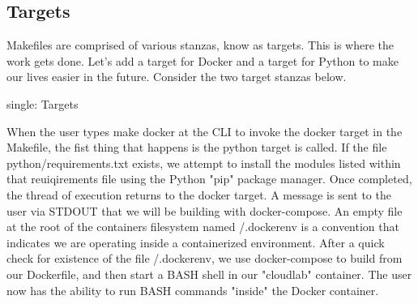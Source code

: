 \hypertarget{targets}{%
\subsection{Targets}\label{targets}}

Makefiles are comprised of various stanzas, know as targets. This is
where the work gets done. Let's add a target for Docker and a target for
Python to make our lives easier in the future. Consider the two target
stanzas below.

single: Targets

\begin{Shaded}
\begin{Highlighting}[]
    
   \NormalTok{ [ -f /.dockerenv ]}\KeywordTok{;}  \KeywordTok{\textbackslash{}}
     \KeywordTok{&&} \KeywordTok{;} 

\NormalTok{: }
   \BuiltInTok{ [} \OtherTok{!} \BuiltInTok{ ]}\NormalTok{; } \VariableTok{$(}\VariableTok{)}  \KeywordTok{&&} \KeywordTok{;} 
   \VariableTok{$(}\VariableTok{)} 
   \BuiltInTok{ [}  \BuiltInTok{ ]}\NormalTok{; } \KeywordTok{\textbackslash{}}
   \KeywordTok{;} 
\end{Highlighting}
\end{Shaded}

When the user types make docker at the CLI to invoke the docker target
in the Makefile, the fist thing that happens is the python target is
called. If the file python/requirements.txt exists, we attempt to
install the modules listed within that reuiqirements file using the
Python "pip" package manager. Once completed, the thread of execution
returns to the docker target. A message is sent to the user via STDOUT
that we will be building with docker-compose. An empty file at the root
of the containers filesystem named /.dockerenv is a convention that
indicates we are operating inside a containerized environment. After a
quick check for existence of the file /.dockerenv, we use docker-compose
to build from our Dockerfile, and then start a BASH shell in our
"cloudlab" container. The user now has the ability to run BASH commands
"inside" the Docker container.

